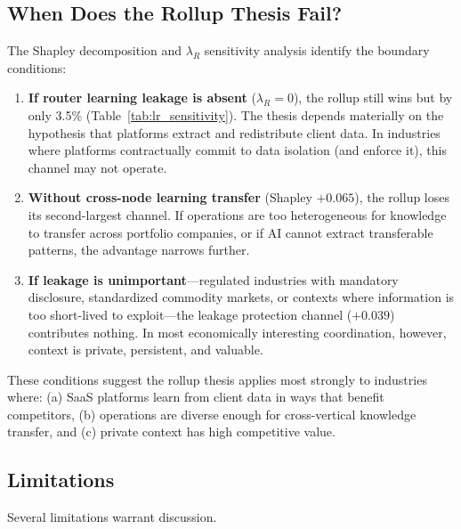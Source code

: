 \documentclass[12pt]{article}
\theoremstyle{definition}
\begin{document}
\subsection{When Does the Rollup Thesis Fail?}

The Shapley decomposition and $\lambda_R$ sensitivity analysis identify the boundary conditions:

\begin{enumerate}[leftmargin=*]
\item \textbf{If router learning leakage is absent} ($\lambda_R = 0$), the rollup still wins but by only 3.5\% (Table~\ref{tab:lr_sensitivity}). The thesis depends materially on the hypothesis that platforms extract and redistribute client data. In industries where platforms contractually commit to data isolation (and enforce it), this channel may not operate.

\item \textbf{Without cross-node learning transfer} (Shapley $+0.065$), the rollup loses its second-largest channel. If operations are too heterogeneous for knowledge to transfer across portfolio companies, or if AI cannot extract transferable patterns, the advantage narrows further.

\item \textbf{If leakage is unimportant}---regulated industries with mandatory disclosure, standardized commodity markets, or contexts where information is too short-lived to exploit---the leakage protection channel ($+0.039$) contributes nothing. In most economically interesting coordination, however, context is private, persistent, and valuable.
\end{enumerate}

\noindent These conditions suggest the rollup thesis applies most strongly to industries where: (a) SaaS platforms learn from client data in ways that benefit competitors, (b) operations are diverse enough for cross-vertical knowledge transfer, and (c) private context has high competitive value.

\subsection{Limitations}

Several limitations warrant discussion.
\end{document}
